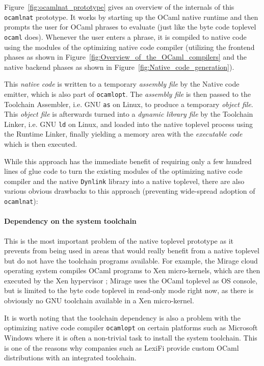 \documentclass[10pt,a4paper,draft,twocolumn]{article}
\makeatletter
\newcommand{\ie}{i.e.\@\xspace}
\makeatother
\begin{document}
Figure~\ref{fig:ocamlnat_prototype} gives an overview of the internals of this \texttt{ocamlnat} prototype.
It works by starting up the OCaml native runtime and then prompts the user for OCaml phrases to evaluate
(just like the byte code toplevel \texttt{ocaml} does). Whenever the user enters a phrase, it is compiled
to native code using the modules of the optimizing native code compiler (utilizing the frontend phases as
shown in Figure~\ref{fig:Overview_of_the_OCaml_compilers} and the native backend phases as shown in
Figure~\ref{fig:Native_code_generation}).

This \emph{native code} is written to a temporary \emph{assembly file} by the Native code emitter, which
is also part of \texttt{ocamlopt}. The \emph{assembly file} is then passed to the Toolchain Assembler, \ie GNU
\texttt{as} on Linux, to produce a temporary \emph{object file}. This \emph{object file} is afterwards turned
into a \emph{dynamic library file} by the Toolchain Linker, \ie GNU \texttt{ld} on Linux, and loaded into the
native toplevel process using the Runtime Linker, finally yielding a memory area with the \emph{executable code}
which is then executed.

While this approach has the immediate benefit of requiring only a few hundred lines of glue code to turn
the existing modules of the optimizing native code compiler and the native \texttt{Dynlink} library into
a native toplevel, there are also various obvious drawbacks to this approach (preventing wide-spread
adoption of \texttt{ocamlnat}):

\paragraph{Dependency on the system toolchain}

This is the most important problem of the native toplevel prototype as it prevents from being
used in areas that would really benefit from a native toplevel but do not have the toolchain programs
available. For example, the Mirage cloud operating system \cite{Mirage11,Madhavapeddy10,Madhavapeddy10hotcloud}
compiles OCaml programs to Xen micro-kernels, which are then executed by the Xen hypervisor \cite{Xen11}; Mirage uses
the OCaml toplevel as OS console, but is limited to the byte code toplevel in read-only mode right now, as
there is obviously no GNU toolchain available in a Xen micro-kernel.

It is worth noting that the toolchain dependency is also a problem with the optimizing native code compiler
\texttt{ocamlopt} on certain platforms such as Microsoft Windows where it is often a non-trivial task to
install the system toolchain. This is one of the reasons why companies such as LexiFi provide custom OCaml
distributions with an integrated toolchain.
\end{document}
